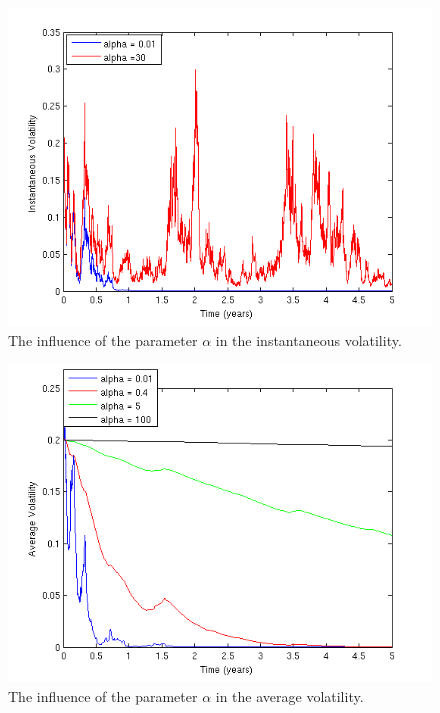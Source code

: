 \documentclass[11pt]{report}
\begin{document}
 \begin{figure}[h]
 \includegraphics{Figures/alpha_effect_sigma.png}
 \caption{The influence of the parameter $\alpha$ in the instantaneous volatility.}
\end{figure}

 \begin{figure}[h]
 \includegraphics{Figures/alpha_effect_xi.png}
 \caption{The influence of the parameter $\alpha$ in the average volatility.}
\end{figure}
\end{document}
